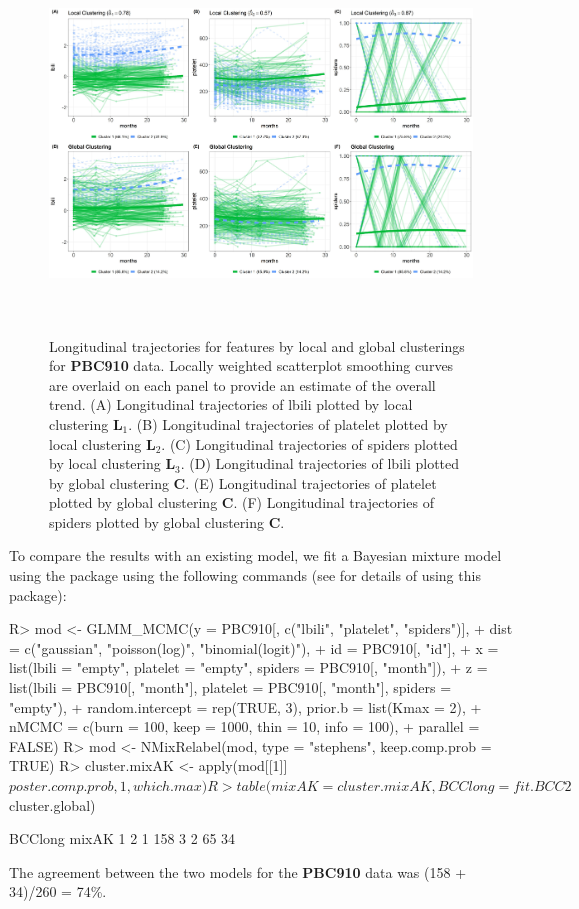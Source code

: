 \begin{figure}[h]
\centering
\includegraphics[width=\textwidth,height=10cm]{./Figures/trajplot_PBC910.JPEG}
\caption{\label{fig:traj} Longitudinal trajectories for features by local and global clusterings for \textbf{PBC910} data. Locally weighted scatterplot smoothing curves are overlaid on each panel to provide an estimate of the overall trend.  (A) Longitudinal trajectories of lbili plotted by local clustering $\boldsymbol{L}_1$. (B) Longitudinal trajectories of platelet plotted by local clustering $\boldsymbol{L}_2$. (C) Longitudinal trajectories of spiders plotted by local clustering $\boldsymbol{L}_3$. (D) Longitudinal trajectories of lbili plotted by global clustering $\boldsymbol{C}$. (E)  Longitudinal trajectories of platelet plotted by global clustering $\boldsymbol{C}$. (F)  Longitudinal trajectories of spiders plotted by global clustering $\boldsymbol{C}$.}
\end{figure}
To compare the results with an existing model, we fit a Bayesian mixture model using the  package using the following commands (see \citep{Komarek2014} for details of using this package): 
\begin{example}
R> mod <- GLMM_MCMC(y = PBC910[, c("lbili", "platelet", "spiders")],
+        dist = c("gaussian", "poisson(log)", "binomial(logit)"),
+        id = PBC910[, "id"], 
+        x = list(lbili = "empty", platelet = "empty", spiders = PBC910[, "month"]), 
+        z = list(lbili = PBC910[, "month"], platelet = PBC910[, "month"], spiders = "empty"),
+        random.intercept = rep(TRUE, 3), prior.b = list(Kmax = 2),
+        nMCMC = c(burn = 100, keep = 1000, thin = 10, info = 100),
+        parallel = FALSE)
R> mod <- NMixRelabel(mod, type = "stephens", keep.comp.prob = TRUE)
R> cluster.mixAK <- apply(mod[[1]]$poster.comp.prob, 1, which.max)
R> table(mixAK = cluster.mixAK, BCClong = fit.BCC2$cluster.global)
\end{example} 
\begin{example}
     BCClong
mixAK   1   2
    1 158   3
    2  65  34
\end{example}
The agreement between the two models for the \textbf{PBC910} data was (158 + 34)/260 = 74\%.
